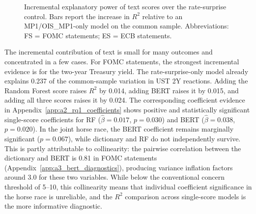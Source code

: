 \begin{figure}[H]
  \centering
  \caption[RQ1 incremental explanatory power chart]{Incremental explanatory
    power of text scores over the rate-surprise control. Bars report the
    increase in $R^2$ relative to an MP1/OIS\_MP1-only model on the common
    sample. Abbreviations: FS = FOMC statements; ES = ECB statements.}
  \label{fig:rq1_method_r2_v31}
\end{figure}

The incremental contribution of text is small for many outcomes and
concentrated in a few cases. For FOMC statements, the strongest incremental
evidence is for the two-year Treasury yield. The rate-surprise-only model
already explains 0.237 of the common-sample variation in UST 2Y reactions.
Adding the Random Forest score raises $R^2$ by 0.014, adding BERT raises
it by 0.015, and adding all three scores raises it by 0.024. The
corresponding coefficient evidence in
Appendix~\ref{app:a2_rq1_coefficients} shows positive and statistically
significant single-score coefficients for RF ($\hat{\beta}=0.017$, $p=0.030$)
and BERT ($\hat{\beta}=0.038$, $p=0.020$). In the joint horse race, the
BERT coefficient remains marginally significant ($p=0.067$), while
dictionary and RF do not independently survive. This is partly attributable to
collinearity: the pairwise correlation between the dictionary and BERT is
0.81 in FOMC statements (Appendix~\ref{app:a3_bert_diagnostics}), producing
variance inflation factors around 3.0 for these two variables. While below the
conventional concern threshold of 5--10, this collinearity means that
individual coefficient significance in the horse race is unreliable, and the
$R^2$ comparison across single-score models is the more informative diagnostic.

